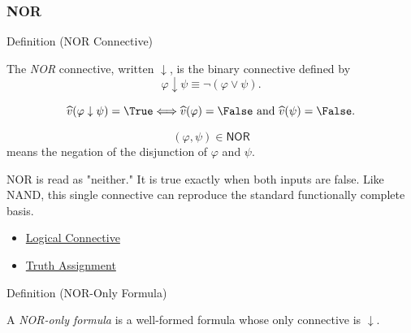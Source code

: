 \subsubsection*{NOR}

\begin{definitionbox}{Definition (NOR Connective)}
\begin{definition}
\label{def:nor-connective-propositional-logic}
The \emph{NOR} connective, written \(\downarrow\), is the binary connective
defined by
\[
\varphi\downarrow\psi\equiv\neg(\varphi\lor\psi).
\]
\end{definition}
\end{definitionbox}

\begin{remark*}
\[
\widehat v(\varphi\downarrow\psi)=\True
\Longleftrightarrow
\widehat v(\varphi)=\False\text{ and }\widehat v(\psi)=\False.
\]
\end{remark*}

\begin{remark*}
\[
  (\varphi,\psi)\in\mathsf{NOR}
\] means the negation of the disjunction of
\(\varphi\) and \(\psi\).
\end{remark*}

\begin{remark*}[Interpretation]
NOR is read as "neither." It is true exactly when both inputs are false. Like
NAND, this single connective can reproduce the standard functionally complete
basis.
\end{remark*}

\begin{dependencies}
\begin{itemize}
  \item \hyperref[def:logical-connective]{Logical Connective}
  \item \hyperref[def:truth-assignment-propositional-logic]{Truth Assignment}
\end{itemize}
\end{dependencies}

\begin{definitionbox}{Definition (NOR-Only Formula)}
\begin{definition}
\label{def:nor-only-formula-propositional-logic}
A \emph{NOR-only formula} is a well-formed formula whose only connective is
\(\downarrow\).
\end{definition}
\end{definitionbox}

